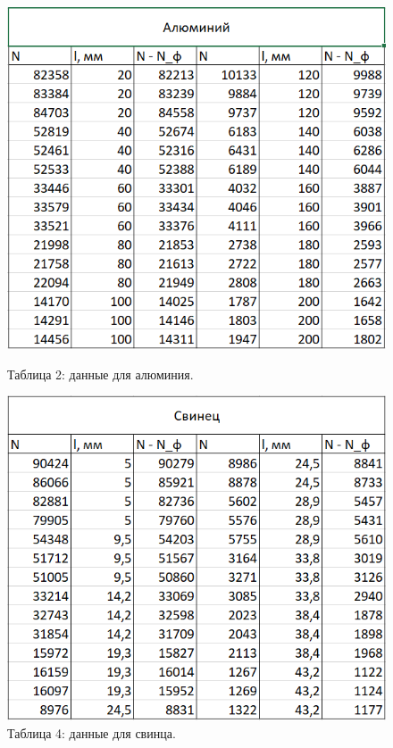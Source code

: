 \documentclass[a4paper, 12pt]{article}%
\begin{document}
\begin{enumerate}
	\begin{figure}[h!]
        \begin{center}
            \begin{minipage}[h!]{0.48\linewidth}
                \includegraphics[width=1\linewidth]{images/table_2.png}
                \caption{Таблица 2: данные для алюминия.}
                \label{Table_2}
            \end{minipage}
            \hfill
            \begin{minipage}[h!]{0.48\linewidth}
                \includegraphics[width=1\linewidth]{images/table_3.png}
                \caption{Таблица 4: данные для свинца.}
                \label{Table_3}
            \end{minipage}
        \end{center}
    \end{figure}		
		

\end{enumerate}
\end{document}
